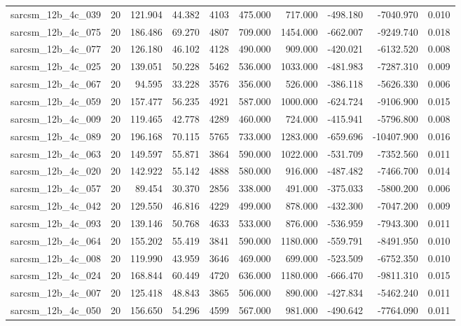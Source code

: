 \begin{tabular}{lrrrrrrrrr}
sarcsm\_12b\_4c\_039 & 20 & 121.904 & 44.382 & 4103 & 475.000 & 717.000 & -498.180 & -7040.970 & 0.010 \\
sarcsm\_12b\_4c\_075 & 20 & 186.486 & 69.270 & 4807 & 709.000 & 1454.000 & -662.007 & -9249.740 & 0.018 \\
sarcsm\_12b\_4c\_077 & 20 & 126.180 & 46.102 & 4128 & 490.000 & 909.000 & -420.021 & -6132.520 & 0.008 \\
sarcsm\_12b\_4c\_025 & 20 & 139.051 & 50.228 & 5462 & 536.000 & 1033.000 & -481.983 & -7287.310 & 0.009 \\
sarcsm\_12b\_4c\_067 & 20 & 94.595 & 33.228 & 3576 & 356.000 & 526.000 & -386.118 & -5626.330 & 0.006 \\
sarcsm\_12b\_4c\_059 & 20 & 157.477 & 56.235 & 4921 & 587.000 & 1000.000 & -624.724 & -9106.900 & 0.015 \\
sarcsm\_12b\_4c\_009 & 20 & 119.465 & 42.778 & 4289 & 460.000 & 724.000 & -415.941 & -5796.800 & 0.008 \\
sarcsm\_12b\_4c\_089 & 20 & 196.168 & 70.115 & 5765 & 733.000 & 1283.000 & -659.696 & -10407.900 & 0.016 \\
sarcsm\_12b\_4c\_063 & 20 & 149.597 & 55.871 & 3864 & 590.000 & 1022.000 & -531.709 & -7352.560 & 0.011 \\
sarcsm\_12b\_4c\_020 & 20 & 142.922 & 55.142 & 4888 & 580.000 & 916.000 & -487.482 & -7466.700 & 0.014 \\
sarcsm\_12b\_4c\_057 & 20 & 89.454 & 30.370 & 2856 & 338.000 & 491.000 & -375.033 & -5800.200 & 0.006 \\
sarcsm\_12b\_4c\_042 & 20 & 129.550 & 46.816 & 4229 & 499.000 & 878.000 & -432.300 & -7047.200 & 0.009 \\
sarcsm\_12b\_4c\_093 & 20 & 139.146 & 50.768 & 4633 & 533.000 & 876.000 & -536.959 & -7943.300 & 0.011 \\
sarcsm\_12b\_4c\_064 & 20 & 155.202 & 55.419 & 3841 & 590.000 & 1180.000 & -559.791 & -8491.950 & 0.010 \\
sarcsm\_12b\_4c\_008 & 20 & 119.990 & 43.959 & 3646 & 469.000 & 699.000 & -523.509 & -6752.350 & 0.010 \\
sarcsm\_12b\_4c\_024 & 20 & 168.844 & 60.449 & 4720 & 636.000 & 1180.000 & -666.470 & -9811.310 & 0.015 \\
sarcsm\_12b\_4c\_007 & 20 & 125.418 & 48.843 & 3865 & 506.000 & 890.000 & -427.834 & -5462.240 & 0.011 \\
sarcsm\_12b\_4c\_050 & 20 & 156.650 & 54.296 & 4599 & 567.000 & 981.000 & -490.642 & -7764.090 & 0.011 \\

\end{tabular}

